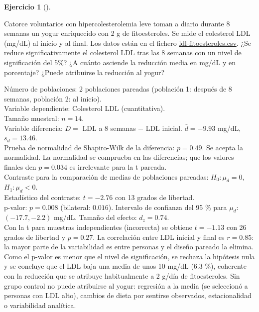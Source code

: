 \documentclass[
  spanish,
  a4paper,
]{scrreport}
\theoremstyle{definition}
\newtheorem{exercise}{Ejercicio}[chapter]
\theoremstyle{remark}
\begin{document}
\begin{exercise}[]\protect\hypertarget{exr-contraste-ia-comparacion-medias-pareadas-ldl}{}\label{exr-contraste-ia-comparacion-medias-pareadas-ldl}

Catorce voluntarios con hipercolesterolemia leve toman a diario durante
8 semanas un yogur enriquecido con 2 g de fitoesteroles. Se mide el
colesterol LDL (mg/dL) al inicio y al final. Los datos están en el
fichero \href{datos/ldl-fitoesteroles.csv}{ldl-fitoesteroles.csv}. ¿Se
reduce significativamente el colesterol LDL tras las 8 semanas con un
nivel de significación del 5\%? ¿A cuánto asciende la reducción media en
mg/dL y en porcentaje? ¿Puede atribuirse la reducción al yogur?

\end{exercise}

\begin{tcolorbox}[enhanced jigsaw, arc=.35mm, bottomrule=.15mm, bottomtitle=1mm, breakable, colback=white, colbacktitle=quarto-callout-tip-color!10!white, colframe=quarto-callout-tip-color-frame, coltitle=black, left=2mm, leftrule=.75mm, opacityback=0, opacitybacktitle=0.6, rightrule=.15mm, title=\textcolor{quarto-callout-tip-color}{\faLightbulb}\hspace{0.5em}{Solución}, titlerule=0mm, toprule=.15mm, toptitle=1mm]

Número de poblaciones: 2 poblaciones pareadas (población 1: después de 8
semanas, población 2: al inicio).\\
Variable dependiente: Colesterol LDL (cuantitativa).\\
Tamaño muestral: \(n=14\).\\
Variable diferencia: \(D=\) LDL a 8 semanas \(-\) LDL inicial.
\(\bar d=-9.93\) mg/dL, \(s_d=13.46\).\\
Prueba de normalidad de Shapiro-Wilk de la diferencia: \(p=0.49\). Se
acepta la normalidad. La normalidad se comprueba en las diferencias; que
los valores finales den \(p=0.034\) es irrelevante para la t pareada.\\
Contraste para la comparación de medias de poblaciones pareadas:
\(H_0:\mu_d=0\), \(H_1:\mu_d< 0\).\\
Estadístico del contraste: \(t=-2.76\) con 13 grados de libertad.\\
p-valor: \(p=0.008\) (bilateral: \(0.016\)). Intervalo de confianza del
95 \% para \(\mu_d\): \((-17.7, -2.2)\) mg/dL. Tamaño del efecto:
\(d_z=0.74\).\\
Con la t para muestras independientes (incorrecta) se obtiene
\(t=-1.13\) con 26 grados de libertad y \(p=0.27\). La correlación entre
LDL inicial y final es \(r=0.85\): la mayor parte de la variabilidad es
entre personas y el diseño pareado la elimina.\\
Como el p-valor es menor que el nivel de significación, se rechaza la
hipótesis nula y se concluye que el LDL baja una media de unos 10 mg/dL
(6.3 \%), coherente con la reducción que se atribuye habitualmente a 2
g/día de fitoesteroles. Sin grupo control no puede atribuirse al yogur:
regresión a la media (se seleccionó a personas con LDL alto), cambios de
dieta por sentirse observados, estacionalidad o variabilidad analítica.


\end{tcolorbox}
\end{document}
